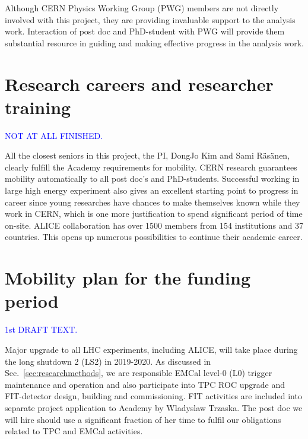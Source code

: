 Although CERN Physics Working Group (PWG) members are not directly involved with this project, they are providing invaluable support to the analysis work. Interaction of post doc and PhD-student with PWG will provide them substantial resource in guiding and making effective progress in the analysis work.

\section{Research careers and researcher training}%
\label{sec:career}

\textcolor{blue}{NOT AT ALL FINISHED.}

All the closest seniors in this project, the PI, DongJo Kim and Sami R\"as\"anen, clearly fulfill the Academy requirements for mobility. CERN research guarantees mobility automatically to all post doc's and PhD-students. Successful working in large high energy experiment also gives an excellent starting point to progress in career since young researches have chances to make themselves known while they work in CERN, which is one more justification to spend significant period of time on-site. ALICE collaboration has over 1500 members from 154 institutions and 37 countries. This opens up numerous possibilities to continue their academic career.

\section{Mobility plan for the funding period}%
\label{sec:mobility}

\textcolor{blue}{1st DRAFT TEXT.}

Major upgrade to all LHC experiments, including ALICE, will take place during the long shutdown 2 (LS2) in 2019-2020. As discussed in Sec.~\ref{sec:researchmethods}, we are responsible EMCal level-0 (L0) trigger maintenance and operation and also participate into TPC ROC upgrade and FIT-detector design, building and commissioning. FIT activities are included into separate project application to Academy by Wladyslaw Trzaska. The post doc we will hire should use a significant fraction of her time to fulfil our obligations related to TPC and EMCal activities.

